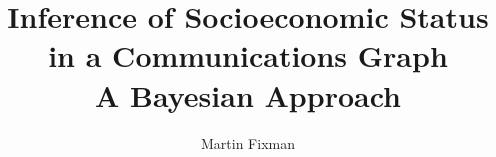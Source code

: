 \documentclass[runningheads, a4paper]{dalthesis/dalthesis}
\title{Inference of Socioeconomic Status \\ in a Communications Graph \\ A Bayesian Approach}
\author{Martin Fixman}
\numberwithin{equation}{section}
\begin{document}
\frontmatter

\begin{abstract}
	
\end{abstract}

\mainmatter



















{}
\end{document}
